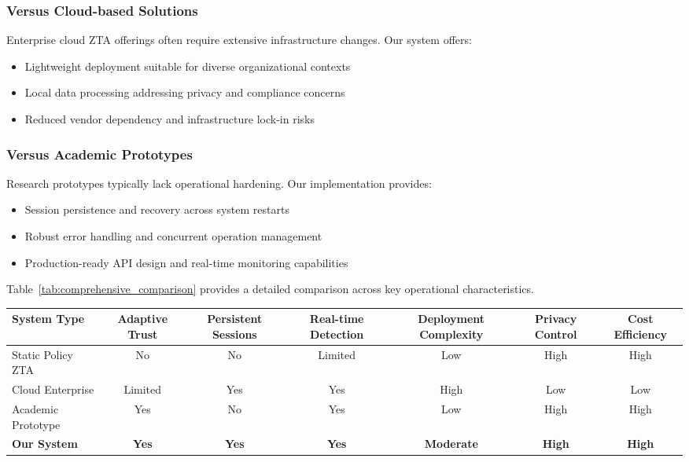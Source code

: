 \documentclass[conference]{IEEEtran}
\begin{document}
\subsubsection{Versus Cloud-based Solutions} 
Enterprise cloud ZTA offerings often require extensive infrastructure changes. Our system offers:
\begin{itemize}[leftmargin=*]
  \item Lightweight deployment suitable for diverse organizational contexts
  \item Local data processing addressing privacy and compliance concerns
  \item Reduced vendor dependency and infrastructure lock-in risks
\end{itemize}

\subsubsection{Versus Academic Prototypes}
Research prototypes typically lack operational hardening. Our implementation provides:
\begin{itemize}[leftmargin=*]
  \item Session persistence and recovery across system restarts
  \item Robust error handling and concurrent operation management  
  \item Production-ready API design and real-time monitoring capabilities
\end{itemize}

Table~\ref{tab:comprehensive_comparison} provides a detailed comparison across key operational characteristics.

\begin{table*}[t]
\centering
\caption{Comprehensive comparison with existing ZTA approaches}
\begin{tabular}{@{}lcccccc@{}}
\toprule
\textbf{System Type} & \textbf{Adaptive Trust} & \textbf{Persistent Sessions} & \textbf{Real-time Detection} & \textbf{Deployment Complexity} & \textbf{Privacy Control} & \textbf{Cost Efficiency} \\
\midrule
Static Policy ZTA & No & No & Limited & Low & High & High \\
Cloud Enterprise & Limited & Yes & Yes & High & Low & Low \\
Academic Prototype & Yes & No & Yes & Low & High & High \\
\textbf{Our System} & \textbf{Yes} & \textbf{Yes} & \textbf{Yes} & \textbf{Moderate} & \textbf{High} & \textbf{High} \\
\bottomrule
\end{tabular}
\label{tab:comprehensive_comparison}
\end{table*}
\end{document}
